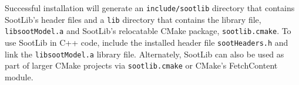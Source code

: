 \documentclass[preprint,letterpaper]{elsarticle}
\begin{document}
Successful installation will generate an \texttt{include/sootlib} directory that contains SootLib's header files and a \texttt{lib} directory that contains the library file, \texttt{libsootModel.a} and SootLib's relocatable CMake package, \texttt{sootlib.cmake}.
To use SootLib in C++ code, include the installed header file \texttt{sootHeaders.h} and link the \texttt{libsootModel.a} library file. Alternately, SootLib can also be used as part of larger CMake projects via \texttt{sootlib.cmake} or CMake's FetchContent module.
\end{document}
